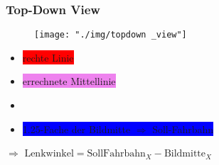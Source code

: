 \documentclass{beamer}
\begin{document}
\begin{frame}
	\frametitle{Top-Down View}
	\begin{center}
		\begin{figure}[h]
			\centering
			\texttt{[image: "./img/topdown \_view"]}
			\label{fig:topdown}
		\end{figure}
	\end{center}

	\begin{itemize}
		\item \colorbox{red}{rechte Linie}
		\item \colorbox{violet}{errechnete Mittellinie}
		\item \colorbox{white}{\color{black}{Bildmitte $\Rightarrow$ Automitte}}
		\item \colorbox{blue}{1.25-Fache der Bildmitte $\Rightarrow$ Soll-Fahrbahn}
	\end{itemize}
	$\Rightarrow$ $\text{Lenkwinkel} = \text{SollFahrbahn}_X - \text{Bildmitte}_X$

\end{frame}
\end{document}
